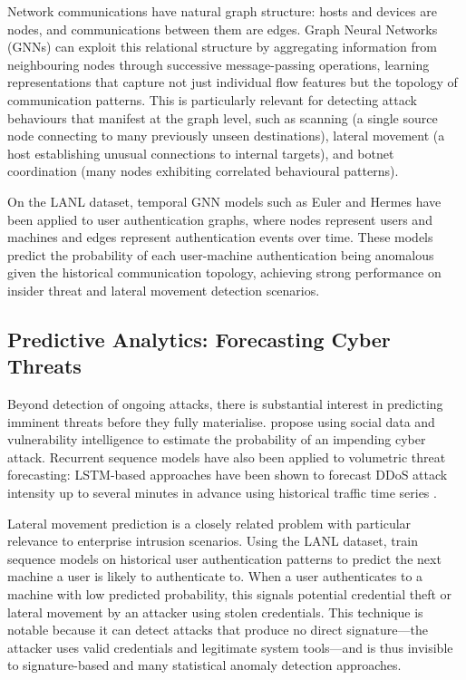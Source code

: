 \documentclass[12pt,a4paper]{report}
\begin{document}
Network communications have natural graph structure: hosts and devices are nodes, and communications between them are edges. Graph Neural Networks (GNNs) can exploit this relational structure by aggregating information from neighbouring nodes through successive message-passing operations, learning representations that capture not just individual flow features but the topology of communication patterns. This is particularly relevant for detecting attack behaviours that manifest at the graph level, such as scanning (a single source node connecting to many previously unseen destinations), lateral movement (a host establishing unusual connections to internal targets), and botnet coordination (many nodes exhibiting correlated behavioural patterns).

On the LANL dataset, temporal GNN models such as Euler \citep{king2023} and Hermes \citep{lo2023} have been applied to user authentication graphs, where nodes represent users and machines and edges represent authentication events over time. These models predict the probability of each user-machine authentication being anomalous given the historical communication topology, achieving strong performance on insider threat and lateral movement detection scenarios.

\subsection{Predictive Analytics: Forecasting Cyber Threats}
\label{sec:predictive}

Beyond detection of ongoing attacks, there is substantial interest in predicting imminent threats before they fully materialise. \citet{munkhdorj2017} propose using social data and vulnerability intelligence to estimate the probability of an impending cyber attack. Recurrent sequence models have also been applied to volumetric threat forecasting: LSTM-based approaches have been shown to forecast DDoS attack intensity up to several minutes in advance using historical traffic time series \citep{kong2025}.

Lateral movement prediction is a closely related problem with particular relevance to enterprise intrusion scenarios. Using the LANL dataset, \citet{turcotte2017} train sequence models on historical user authentication patterns to predict the next machine a user is likely to authenticate to. When a user authenticates to a machine with low predicted probability, this signals potential credential theft or lateral movement by an attacker using stolen credentials. This technique is notable because it can detect attacks that produce no direct signature---the attacker uses valid credentials and legitimate system tools---and is thus invisible to signature-based and many statistical anomaly detection approaches.
\end{document}
